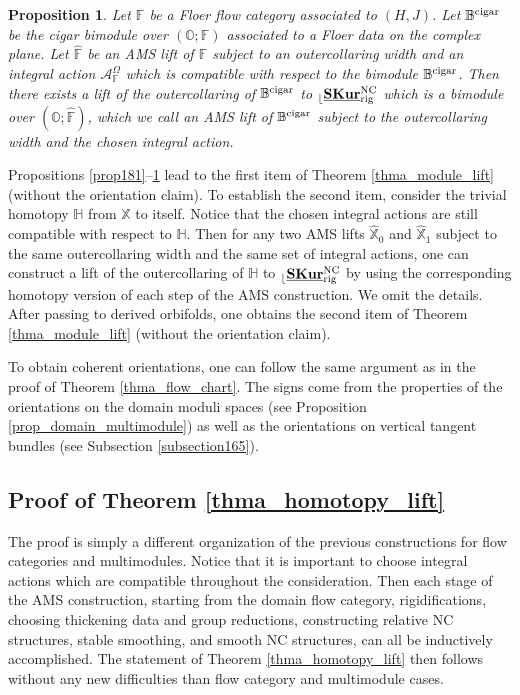 \documentclass[reqno, 10pt]{amsart}
\numberwithin{equation}{section}
\numberwithin{equation}{section}
\newtheorem{prop}[thm]{Proposition}
\theoremstyle{definition}
\theoremstyle{remark}
\newcommand{\mb}{\mathbb}
\newcommand{\mc}{\mathcal}
\renewcommand{\outer}{{}_{\lfloor}}
\newcommand{\uds}[1]{\underline{\smash{#1}}}
\begin{document}
\begin{prop}\label{prop183}
Let ${\mb F}$ be a Floer flow category associated to $(H,J)$. Let ${\mb B}^{\rm cigar}$ be the cigar bimodule over $({\mb O}; {\mb F})$ associated to a Floer data on the complex plane. Let $\hat {\mb F}$ be an AMS lift of ${\mb F}$ subject to an outercollaring width and an integral action ${\mc A}_{\mb F}^\Omega$ which is compatible with respect to the bimodule ${\mb B}^{\rm cigar}$. Then there exists a lift of the outercollaring of ${\mb B}^{\rm cigar}$ to $\outer \uds{\bf SKur}_{\rm rig}^{\rm NC}$ which is a bimodule over $({\mb O}; \hat {\mb F})$, which we call an AMS lift of ${\mb B}^{\rm cigar}$ subject to the outercollaring width and the chosen integral action. 
\end{prop}

Propositions \ref{prop181}--\ref{prop183} lead to the first item of Theorem \ref{thma_module_lift} (without the orientation claim). To establish the second item, consider the trivial homotopy ${\mb H}$ from ${\mb X}$ to itself. Notice that the chosen integral actions are still compatible with respect to ${\mb H}$. Then for any two AMS lifts $\hat {\mb X}_0$ and $\hat{\mb X}_1$ subject to the same outercollaring width and the same set of integral actions, one can construct a lift of the outercollaring of ${\mb H}$ to $\outer \uds{\bf SKur}_{\rm rig}^{\rm NC}$ by using the corresponding homotopy version of each step of the AMS construction. We omit the details. After passing to derived orbifolds, one obtains the second item of Theorem \ref{thma_module_lift} (without the orientation claim).

To obtain coherent orientations, one can follow the same argument as in the proof of Theorem \ref{thma_flow_chart}. The signs   come  from the properties of the orientations on the domain moduli spaces (see Proposition \ref{prop_domain_multimodule}) as well as the orientations on vertical tangent bundles (see Subsection \ref{subsection165}). 

\subsection{Proof of Theorem \ref{thma_homotopy_lift}}

The proof is simply a different organization of the previous constructions for flow categories and multimodules. Notice that it is important to choose integral actions which are compatible throughout the consideration. Then each stage of the AMS construction, starting from the domain flow category, rigidifications, choosing thickening data and group reductions, constructing relative NC structures, stable smoothing, and smooth NC structures, can all be inductively accomplished. The statement of Theorem \ref{thma_homotopy_lift} then follows without any new difficulties than flow category and multimodule cases. 
\end{document}
